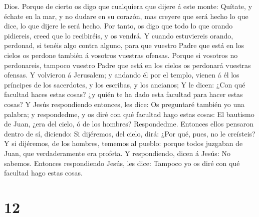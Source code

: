 Dios.  Porque de cierto os digo que cualquiera que dijere á
este monte: Quítate, y échate en la mar, y no dudare en su corazón, mas
creyere que será hecho lo que dice, lo que dijere le será hecho.
 Por tanto, os digo que todo lo que orando pidiereis, creed
que lo recibiréis, y os vendrá.  Y cuando estuviereis
orando, perdonad, si tenéis algo contra alguno, para que vuestro Padre
que está en los cielos os perdone también á vosotros vuestras ofensas.
 Porque si vosotros no perdonareis, tampoco vuestro Padre
que está en los cielos os perdonará vuestras ofensas.  Y
volvieron á Jerusalem; y andando él por el templo, vienen á él los
príncipes de los sacerdotes, y los escribas, y los ancianos;
 Y le dicen: ¿Con qué facultad haces estas cosas? ¿y quién
te ha dado esta facultad para hacer estas cosas?  Y Jesús
respondiendo entonces, les dice: Os preguntaré también yo una palabra; y
respondedme, y os diré con qué facultad hago estas cosas: 
El bautismo de Juan, ¿era del cielo, ó de los hombres? Respondedme.
 Entonces ellos pensaron dentro de sí, diciendo: Si
dijéremos, del cielo, dirá: ¿Por qué, pues, no le creísteis?
 Y si dijéremos, de los hombres, tememos al pueblo: porque
todos juzgaban de Juan, que verdaderamente era profeta.  Y
respondiendo, dicen á Jesús: No sabemos. Entonces respondiendo Jesús,
les dice: Tampoco yo os diré con qué facultad hago estas cosas.

\hypertarget{section-11}{%
\section{12}\label{section-11}}

